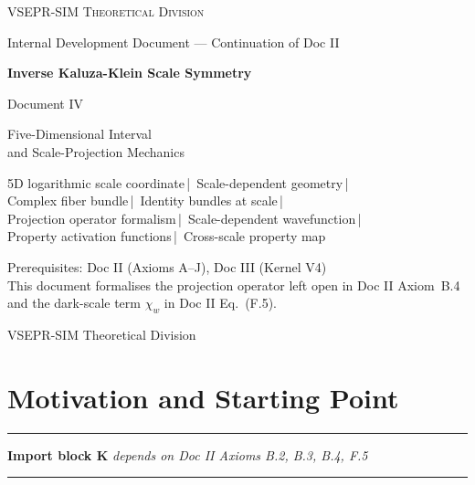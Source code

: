 \documentclass[11pt, a4paper, oneside]{article}
\theoremstyle{definition}
\theoremstyle{plain}
\theoremstyle{remark}
\begin{document}
\begin{titlepage}
  \centering
  \vspace*{1.5cm}
  {\large\scshape VSEPR-SIM Theoretical Division\par}
  \vspace{0.3cm}
  {\small Internal Development Document --- Continuation of Doc II\par}
  \vspace{1.2cm}
  {\Huge\bfseries Inverse Kaluza-Klein Scale Symmetry\par}
  \vspace{0.5cm}
  {\LARGE Document IV\par}
  \vspace{0.4cm}
  {\Large Five-Dimensional Interval\\[0.25em]
   and Scale-Projection Mechanics\par}
  \vspace{1.2cm}
  {\normalsize
    5D logarithmic scale coordinate\,|\,
    Scale-dependent geometry\,|\,\\[0.3em]
    Complex fiber bundle\,|\,
    Identity bundles at scale\,|\,\\[0.3em]
    Projection operator formalism\,|\,
    Scale-dependent wavefunction\,|\,\\[0.3em]
    Property activation functions\,|\,
    Cross-scale property map\par
  }
  \vspace{1.5cm}
  {\normalsize
    Prerequisites: Doc II (Axioms A--J), Doc III (Kernel V4)\\[0.4em]
    This document formalises the projection operator
    left open in Doc II Axiom~B.4 and
    the dark-scale term $\chi_w$ in Doc II Eq.~(F.5).
  \par}
  \vspace{1.5cm}
  {\large VSEPR-SIM Theoretical Division\par}
\end{titlepage}

\tableofcontents
\newpage

\section{Motivation and Starting Point}
\label{sec:motivation}

\noindent\rule{\linewidth}{0.8pt}
\textbf{Import block K} \hfill
  \textit{depends on Doc II Axioms B.2, B.3, B.4, F.5}
\noindent\rule{\linewidth}{0.4pt}
\end{document}
